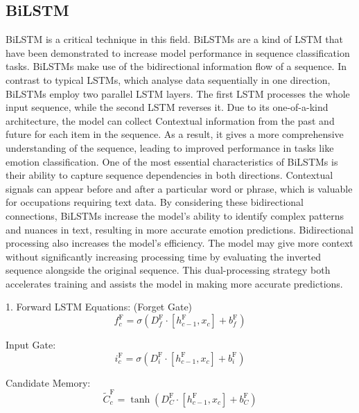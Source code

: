 \documentclass[a4paper,fleqn]{cas-sc}
\begin{document}
\subsection{BiLSTM}
BiLSTM is a critical technique in this field. BiLSTMs are a kind of LSTM that have been demonstrated to increase model performance in sequence classification tasks. BiLSTMs make use of the bidirectional information flow of a sequence. In contrast to typical LSTMs, which analyse data sequentially in one direction, BiLSTMs employ two parallel LSTM layers. The first LSTM processes the whole input sequence, while the second LSTM reverses it. Due to its one-of-a-kind architecture, the model can collect Contextual information from the past and future for each item in the sequence. As a result, it gives a more comprehensive understanding of the sequence, leading to improved performance in tasks like emotion classification\cite{heidari2020short,rajabi2020multi,joshi2022deep}. One of the most essential characteristics of BiLSTMs is their ability to capture sequence dependencies in both directions. Contextual signals can appear before and after a particular word or phrase, which is valuable for occupations requiring text data. By considering these bidirectional connections, BiLSTMs increase the model's ability to identify complex patterns and nuances in text, resulting in more accurate emotion predictions. Bidirectional processing also increases the model's efficiency. The model may give more context without significantly increasing processing time by evaluating the inverted sequence alongside the original sequence. This dual-processing strategy both accelerates training and assists the model in making more accurate predictions\cite{wang2011solar}.



1. Forward LSTM Equations:
(Forget Gate)
\begin{equation}
f_c^{\text{F}} = \sigma(D_f^{\text{F}} \cdot [h_{c-1}^{\text{F}}, x_c] + b_f^{\text{F}})
\end{equation}

Input Gate:
\begin{equation}
i_c^{\text{F}} = \sigma(D_i^{\text{F}} \cdot [h_{c-1}^{\text{F}}, x_c] + b_i^{\text{F}})
\end{equation}

Candidate Memory:
\begin{equation}
\tilde{C}_c^{\text{F}} = \tanh(D_C^{\text{F}} \cdot [h_{c-1}^{\text{F}}, x_c] + b_C^{\text{F}})
\end{equation}
\end{document}
